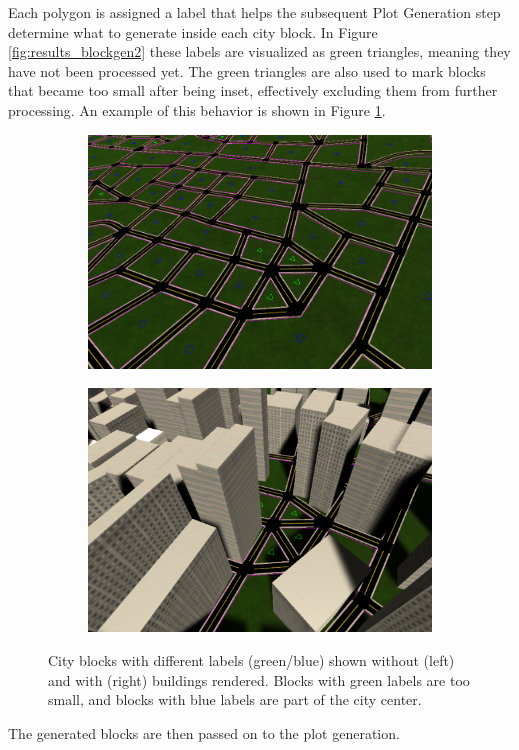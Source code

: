 Each polygon is assigned a label that helps the subsequent Plot Generation step determine what to generate inside each city block.
In Figure \ref{fig:results_blockgen2} these labels are visualized as green triangles, meaning they have not been processed yet.
The green triangles are also used to mark blocks that became too small after being inset, effectively excluding them from further processing.
An example of this behavior is shown in Figure \ref{fig:results_blockgen3}.

\begin{figure}[h!]
  \centering
  \begin{subfigure}[b]{0.47\textwidth}
    \includegraphics[width=\textwidth]{figure/results_blockgen3.png}
  \end{subfigure}
  \quad
  \begin{subfigure}[b]{0.45\textwidth}
    \includegraphics[width=\textwidth]{figure/results_blockgen4.png}
  \end{subfigure}

  \caption{City blocks with different labels (green/blue) shown without (left) and with (right) buildings rendered. Blocks with green labels are too small, and blocks with blue labels are part of the city center.}
  \label{fig:results_blockgen3}
\end{figure}

The generated blocks are then passed on to the plot generation.